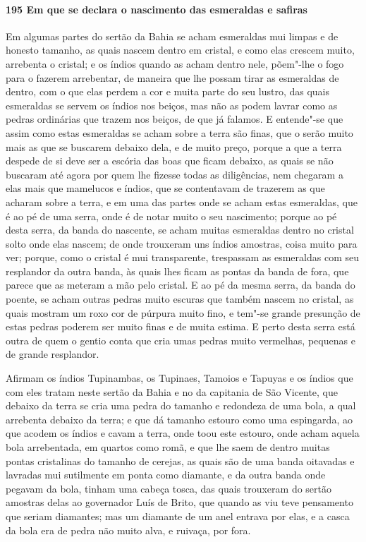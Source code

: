 \begin{linenumbers}
\paragraph{195 Em que se declara o nascimento das esmeraldas e safiras}\quad
Em algumas partes do sertão da Bahia se acham esmeraldas mui limpas e de honesto tamanho,
as quais nascem dentro em cristal, e como elas crescem muito, arrebenta o cristal; e os
índios quando as acham dentro nele, põem"-lhe o fogo para o fazerem arrebentar, de maneira
que lhe possam tirar as esmeraldas de dentro, com o que elas perdem a cor e muita parte do
seu lustro, das quais esmeraldas se servem os índios nos beiços, mas não as podem lavrar
como as pedras ordinárias que trazem nos beiços, de que já falamos. E entende"-se que assim
como estas esmeraldas se acham sobre a terra são finas, que o serão muito mais as que se
buscarem debaixo dela, e de muito preço, porque a que a terra despede de si deve ser a
escória das boas que ficam debaixo, as quais se não buscaram até agora por quem lhe
fizesse todas as diligências, nem chegaram a elas mais que mamelucos e índios, que se
contentavam de trazerem as que acharam sobre a terra, e em uma das partes onde se acham
estas esmeraldas, que é ao pé de uma serra, onde é de notar muito o seu nascimento; porque
ao pé desta serra, da banda do nascente, se acham muitas esmeraldas dentro no cristal
solto onde elas nascem; de onde trouxeram uns índios amostras, coisa muito para ver;
porque, como o cristal é mui transparente, trespassam as esmeraldas com seu resplandor da
outra banda, às quais lhes ficam as pontas da banda de fora, que parece que as meteram a
mão pelo cristal. E ao pé da mesma serra, da banda do poente, se acham outras pedras muito
escuras que também nascem no cristal, as quais mostram um roxo cor de púrpura muito fino,
e tem"-se grande presunção de estas pedras poderem ser muito finas e de muita estima. E
perto desta serra está outra de quem o gentio conta que cria umas pedras muito vermelhas,
pequenas e de grande resplandor.

Afirmam os índios Tupinambas, os Tupinaes, Tamoios e Tapuyas e os índios que com eles
tratam neste sertão da Bahia e no da capitania de São Vicente, que debaixo da terra se
cria uma pedra do tamanho e redondeza de uma bola, a qual arrebenta debaixo da terra; e
que dá tamanho estouro como uma espingarda, ao que acodem os índios e cavam a terra, onde
toou este estouro, onde acham aquela bola arrebentada, em quartos como romã, e que lhe
saem de dentro muitas pontas cristalinas do tamanho de cerejas, as quais são de uma banda
oitavadas e lavradas mui sutilmente em ponta como diamante, e da outra banda onde pegavam
da bola, tinham uma cabeça tosca, das quais trouxeram do sertão amostras delas ao
governador Luís de Brito, que quando as viu teve pensamento que seriam diamantes; mas um
diamante de um anel entrava por elas, e a casca da bola era de pedra não muito alva, e
ruivaça, por fora.


\end{linenumbers}
